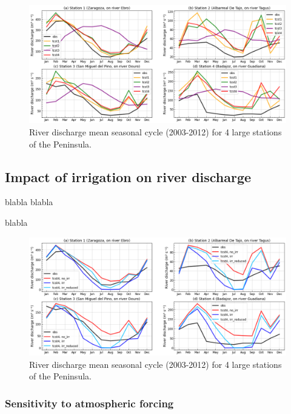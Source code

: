 \begin{figure}[htbp]
    \centering
    \includegraphics[width=\linewidth]{images/eval_halfdeg/river_discharge/merit_tcst_4stations_SC.png}
    \caption{River discharge mean seasonal cycle (2003-2012) for 4 large stations of the Peninsula.}
    \label{fig:merit_tcsts_stations_SC}
\end{figure}

\subsection{Impact of irrigation on river discharge}

blabla
blabla

blabla


\begin{figure}[htbp]
    \centering
    \includegraphics[width=\linewidth]{images/eval_halfdeg/river_discharge/merit_irr_4stations_SC.png}
    \caption{River discharge mean seasonal cycle (2003-2012) for 4 large stations of the Peninsula.}
    \label{fig:merit_irr_stations_SC}
\end{figure}

\subsubsection{Sensitivity to atmospheric forcing}


